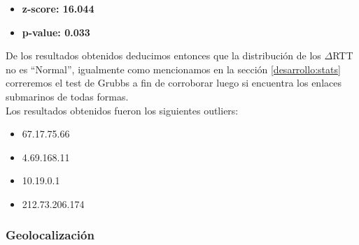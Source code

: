 \begin{itemize}
\item \textbf{z-score: 16.044}
\item \textbf{p-value: 0.033}
\end{itemize}

De los resultados obtenidos deducimos entonces que la distribución de los $\Delta$RTT no es ``Normal'', igualmente como mencionamos en la sección \ref{desarrollo:stats} correremos el test de Grubbs a fin de corroborar luego si encuentra los enlaces submarinos de todas formas.\\
Los resultados obtenidos fueron los siguientes outliers:

\begin{itemize}
\item 67.17.75.66   
\item 4.69.168.11   
\item 10.19.0.1
\item 212.73.206.174
\end{itemize}


\subsubsection{Geolocalización}

